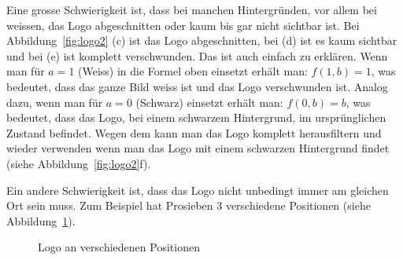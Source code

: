 \documentclass[12pt,a4paper]{report}
\begin{document}
Eine grosse Schwierigkeit ist, dass bei manchen Hintergründen, vor allem bei weissen, das Logo abgeschnitten oder kaum bis gar nicht sichtbar ist.
Bei Abbildung~\ref{fig:logo2} (c) ist das Logo abgeschnitten, bei (d) ist es kaum sichtbar und bei (e) ist komplett verschwunden.
Das ist auch einfach zu erklären.
Wenn man für $a = 1$ (Weiss) in die Formel oben einsetzt erhält man: $f(1, b) = 1$, was bedeutet, dass das ganze Bild weiss ist und das Logo verschwunden ist.
Analog dazu, wenn man für $a = 0$ (Schwarz) einsetzt erhält man: $f(0, b) = b$, was bedeutet, dass das Logo, bei einem schwarzem Hintergrund, im ursprünglichen Zustand befindet.
Wegen dem kann man das Logo komplett herausfiltern und wieder verwenden wenn man das Logo mit einem schwarzen Hintergrund findet (siehe Abbildung~\ref{fig:logo2}f).

Ein andere Schwierigkeit ist, dass das Logo nicht unbedingt immer am gleichen Ort sein muss.
Zum Beispiel hat Prosieben 3 verschiedene Positionen (siehe Abbildung~\ref{fig:logo3}).
\begin{figure}[h]%
    \centering
    \qquad
    \qquad
    \caption{Logo an verschiedenen Positionen}%
    \label{fig:logo3}%
\end{figure}
\end{document}
